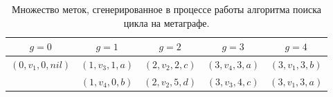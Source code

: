 \documentclass[14pt]{mmcs-article}
\begin{document}
\begin{table}[H]
    \centering
    \begin{tabular}{ | c | c | c | c | c | }
        \hline
        $g = 0$            & $g = 1$           & $g = 2$           & $g = 3$           & $g = 4$            \\ \hline
        $(0, v_1, 0, nil)$ & $(1, v_3,  1, a)$ & $(2, v_2,  2, c)$ & $(3, v_4,  3, a)$ & $(3, v_1,  3, b)$  \\ \hline
                           & $(1, v_4,  0, b)$ & $(2, v_2,  5, d)$ & $(3, v_3,  4, c)$ & $(3, v_1,  3, a)$  \\ \hline
    \end{tabular}
    \caption{ Множество меток, сгенерированное в процессе работы алгоритма поиска цикла на метаграфе. }
    \label{cycle_search_mod_table}
\end{table}
\end{document}
